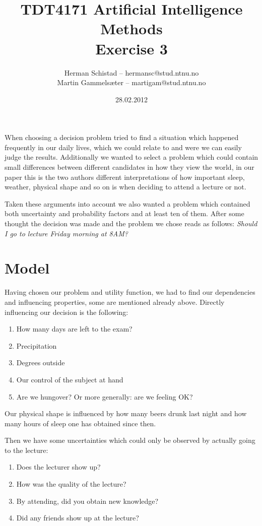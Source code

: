 \documentclass{article}
\title{TDT4171 Artificial Intelligence Methods \\ Exercise 3}
\author{Herman Schistad -- hermansc@stud.ntnu.no \\ Martin Gammelsæter -- martigam@stud.ntnu.no}
\date{28.02.2012}
\begin{document}
\maketitle

When choosing a decision problem tried to find a situation which happened
frequently in our daily lives, which we could relate to and were we can easily
judge the results. Additionally we wanted to select a problem which could
contain small differences between different candidates in how they view the
world, in our paper this is the two authors different interpretations of how
important sleep, weather, physical shape and so on is when deciding to attend a
lecture or not.

Taken these arguments into account we also wanted a problem which contained
both uncertainty and probability factors and at least ten of them. After some
thought the decision was made and the problem we chose reads as follows:
\emph{Should I go to lecture Friday morning at 8AM?}

\section*{Model}

Having chosen our problem and utility function, we had to find our dependencies
and influencing properties, some are mentioned already above. Directly
influencing our decision is the following:

\begin{enumerate}
  \item How many days are left to the exam?
  \item Precipitation
  \item Degrees outside
  \item Our control of the subject at hand
  \item Are we hungover? Or more generally: are we feeling OK?
\end{enumerate}

Our physical shape is influenced by how many beers drunk last night and how
many hours of sleep one has obtained since then. 

Then we have some uncertainties which could only be observed by actually going
to the lecture:

\begin{enumerate}
  \item Does the lecturer show up?
  \item How was the quality of the lecture?
  \item By attending, did you obtain new knowledge?
  \item Did any friends show up at the lecture?
\end{enumerate}
\end{document}
